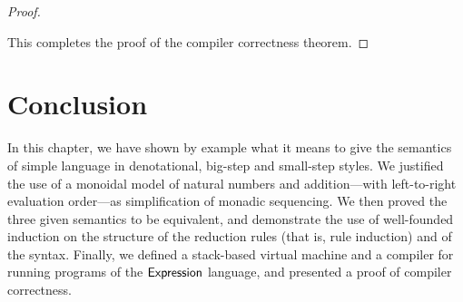 \begin{proof}
\begin{description}

\end{description}
This completes the proof of the compiler correctness theorem.
\end{proof}



\section{Conclusion}%

In this chapter, we have shown by example what it means to give the
semantics of simple language in denotational, big-step and small-step
styles. We justified the use of a monoidal model of natural numbers and
addition---with left-to-right evaluation order---as simplification of
monadic sequencing. We then proved the three given semantics to be
equivalent, and demonstrate the use of well-founded induction on the
structure of the reduction rules (that is, rule induction) and of the
syntax. Finally, we defined a stack-based virtual machine and a compiler for
running programs of the $\textsf{Expression}$ language, and presented a proof of
compiler correctness.



